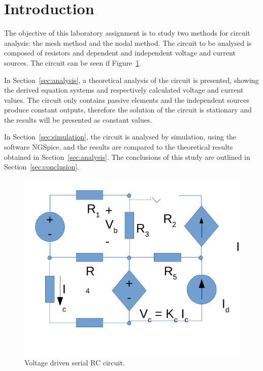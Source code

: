 \section{Introduction}
\label{sec:introduction}

\par The objective of this laboratory assignment is to study two methods for circuit analysis: the mesh method and the nodal method. The circuit to be analysed is composed of resistors and dependent and independent voltage and current sources. The circuit can be seen if Figure~\ref{fig:rc}. 

\par In Section~\ref{sec:analysis}, a theoretical analysis of the circuit is presented, showing the derived equation systems and respectively calculated voltage and current values. The circuit only contains passive elements and the independent sources produce constant outputs, therefore the solution of the circuit is stationary and the results will be presented as constant values.
\par In Section~\ref{sec:simulation}, the circuit is analysed by
simulation, using the software NGSpice, and the results are compared to the theoretical results obtained in
Section~\ref{sec:analysis}. The conclusions of this study are outlined in
Section~\ref{sec:conclusion}.

\begin{figure}[H]
\centering
\includegraphics[width=10 cm]{rc.pdf}
\caption{Voltage driven serial RC circuit.}
\label{fig:rc}
\end{figure}
